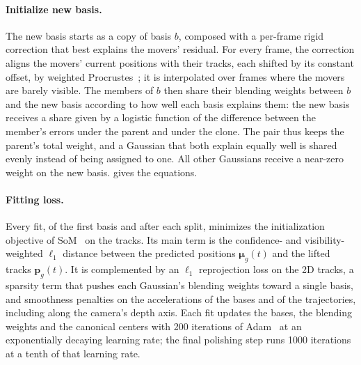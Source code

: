 \paragraph{Initialize new basis.}
The new basis starts as a copy of basis $b$, composed with a per-frame rigid correction that best explains the movers' residual.
For every frame, the correction aligns the movers' current positions with their tracks, each shifted by its constant offset, by weighted Procrustes~\cite{umeyama1991least}; it is interpolated over frames where the movers are barely visible.
The members of $b$ then share their blending weights between $b$ and the new basis according to how well each basis explains them: the new basis receives a share given by a logistic function of the difference between the member's errors under the parent and under the clone.
The pair thus keeps the parent's total weight, and a Gaussian that both explain equally well is shared evenly instead of being assigned to one.
All other Gaussians receive a near-zero weight on the new basis.
 gives the equations.




\paragraph{Fitting loss.}
Every fit, of the first basis and after each split, minimizes the initialization objective of SoM~\cite{wang2025shape} on the tracks.
Its main term is the confidence- and visibility-weighted $\ell_1$ distance between the predicted positions $\boldsymbol{\mu}_g(t)$ and the lifted tracks $\mathbf{p}_g(t)$.
It is complemented by an $\ell_1$ reprojection loss on the 2D tracks, a sparsity term that pushes each Gaussian's blending weights toward a single basis, and smoothness penalties on the accelerations of the bases and of the trajectories, including along the camera's depth axis.
Each fit updates the bases, the blending weights and the canonical centers with 200 iterations of Adam~\cite{kingma2014adam} at an exponentially decaying learning rate; the final polishing step runs 1000 iterations at a tenth of that learning rate.

